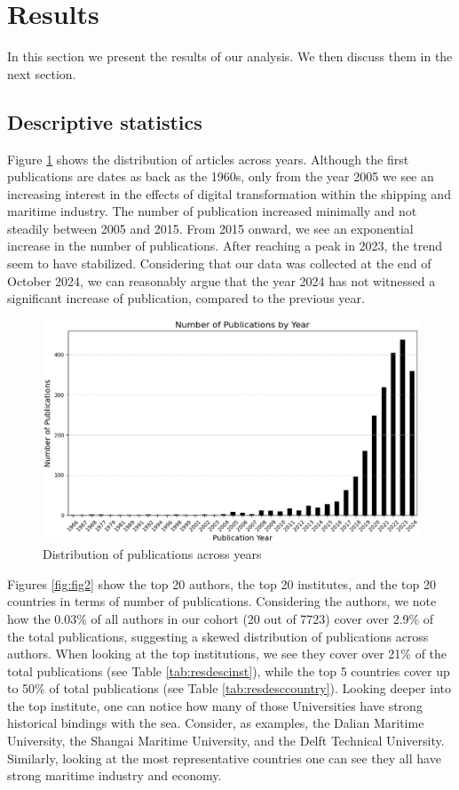 \documentclass[a4paper, review, endfloat, doubleblind, authoryear]{elsarticle}
\begin{document}
	\section{Results}
	In this section we present the results of our analysis. We then discuss them in the next section.
	
	\subsection{Descriptive statistics}
	Figure \ref{fig:fig1} shows the distribution of articles across years. Although the first publications are dates as back as the 1960s, only from the year 2005 we see an increasing interest in the effects of digital transformation within the shipping and maritime industry. The number of publication increased minimally and not steadily between 2005 and 2015. From 2015 onward, we see an exponential increase in the number of publications. After reaching a peak in 2023, the trend seem to have stabilized. Considering that our data was collected at the end of October 2024, we can reasonably argue that the year 2024 has not witnessed a significant increase of publication, compared to the previous year.
	
	\begin{figure}[htbp]
		\centering
		\includegraphics[width=\linewidth]{pics/no_publications_year.eps}
		\caption{Distribution of publications across years}\label{fig:fig1}
	\end{figure}
	
	Figures \ref{fig:fig2} show the top 20 authors, the top 20 institutes, and the top 20 countries in terms of number of publications. Considering the authors, we note how the 0.03\% of all authors in our cohort (20 out of 7723) cover over 2.9\% of the total publications, suggesting a skewed distribution of publications across authors. When looking at the top institutions, we see they cover over 21\% of the total publications (see Table \ref{tab:resdescinst}), while the top 5 countries cover up to 50\% of total publications (see Table \ref{tab:resdesccountry}). Looking deeper into the top institute, one can notice how many of those Universities have strong historical bindings with the sea. Consider, as examples, the Dalian Maritime University, the Shangai Maritime University, and the Delft Technical University. Similarly, looking at the most representative countries one can see they all have strong maritime industry and economy.
	
\end{document}
